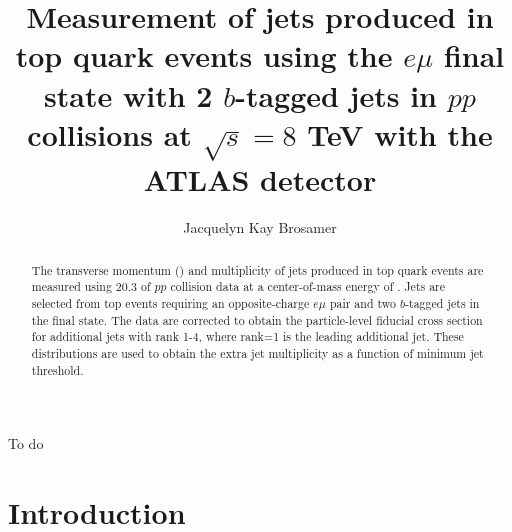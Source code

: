 \documentclass[12pt]{ucbthesis}
\begin{document}

\title{Measurement of jets produced in top quark events using the $e\mu$ final state with 2 $b$-tagged jets in $pp$ collisions at $\sqrt{s}=8$ TeV with the ATLAS detector}
\author{Jacquelyn Kay Brosamer}
\prevdegrees{}




\maketitle
\approvalpage
\copyrightpage
\begin{abstract}
 The transverse momentum (\pt) and multiplicity of jets produced in top quark events are measured using 20.3 \ifb of $pp$ collision data at a center-of-mass energy of  \tev. Jets are selected from top events requiring an opposite-charge $e\mu$ pair and two $b$-tagged jets in the final state. 
The data are corrected to obtain the particle-level fiducial cross section \sigmapt for additional jets with rank 1-4, where rank=1 is the leading additional jet. These distributions are used to obtain the extra jet multiplicity as a function of minimum jet \pt threshold.
\end{abstract}
\begin{frontmatter}

\tableofcontents
\clearpage
\listoffigures
\clearpage
\listoftables

\begin{acknowledgements}
To do
\end{acknowledgements}

\end{frontmatter}

\pagestyle{headings}
\chapter{Introduction}
\label{ch:intro}

\end{document}
